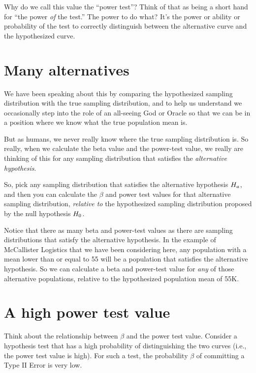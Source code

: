 \documentclass[../../../main.tex]{subfiles}
\begin{document}
\noindent
Why do we call this value the ``power test''? Think of that as being a short hand for ``the power \emph{of} the test.'' The power to do what? It's the power or ability or probability of the test to correctly distinguish between the alternative curve and the hypothesized curve. 


\section{Many alternatives}

We have been speaking about this by comparing the hypothesized sampling distribution with the true sampling distribution, and to help us understand we occasionally step into the role of an all-seeing God or Oracle so that we can be in a position where we know what the true population mean is. 

But as humans, we never really know where the true sampling distribution is. So really, when we calculate the beta value and the power-test value, we really are thinking of this for any sampling distribution that satisfies the \emph{alternative hypothesis}. 

So, pick any sampling distribution that satisfies the alternative hypothesis $\AltHyp/$, and then you can calculate the $\beta$ and power test values for that alternative sampling distribution, \emph{relative to} the hypothesized sampling distribution proposed by the null hypothesis $\NullHyp/$.

Notice that there as many beta and power-test values as there are sampling distributions that satisfy the alternative hypothesis. In the example of McCallister Logistics that we have been considering here, any population with a mean lower than or equal to 55 will be a population that satisfies the alternative hypothesis. So we can calculate a beta and power-test value for \emph{any} of those alternative populations, relative to the hypothesized population mean of 55K.


\section{A high power test value}

Think about the relationship between $\beta$ and the power test value. Consider a hypothesis test that has a high probability of distinguishing the two curves (i.e., the power test value is high). For such a test, the probability $\beta$ of committing a Type II Error is very low. 
\end{document}
